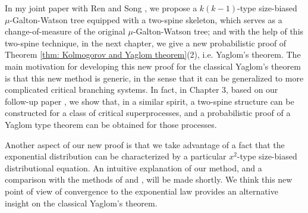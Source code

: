\documentclass[UTF8]{pkuthss}
\theoremstyle{plain}
\theoremstyle{definition}
\numberwithin{equation}{section}
\begin{document}
In my joint paper with Ren and Song \cite{RenSongSun20182spine}, we propose a $k(k-1)$-type size-biased $\mu$-Galton-Watson tree equipped with a two-spine skeleton, which serves as a change-of-measure of the original $\mu$-Galton-Watson tree;
and with the help of this two-spine technique, in the next chapter, we give a new probabilistic proof of Theorem \ref{thm: Kolmogorov and Yaglom theorem}(2), i.e. Yaglom's theorem.
The main motivation for developing this new proof for the classical Yaglom's theorem is that this new method is generic, in the sense that it can be generalized to more complicated critical branching systems.
In fact, in Chapter 3, based on our follow-up
paper \cite{RenSongSun2019Spine}, we show that, in a similar spirit, a two-spine structure can be constructed for a class of critical superprocesses, and a probabilistic proof of a Yaglom type theorem can be obtained for those processes.



Another aspect of our new proof is that we take advantage of a fact that the exponential distribution can be characterized by a particular $x^2$-type size-biased distributional equation.
An intuitive explanation of our method,
and a comparison with the methods of \cite{Geiger2000New} and \cite{LyonsPemantlePeres1995Conceptual}, will be made shortly.
We think this new point of view of convergence to the exponential law provides an alternative insight on the classical Yaglom's theorem.
\end{document}
